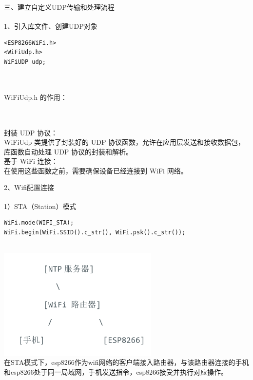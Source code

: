 \documentclass[16pt]{beamer}	%
\begin{document}
		\begin{frame}[fragile]
		三、建立自定义UDP传输和处理流程
		\\ \hspace*{\fill} \\1、引入库文件、创建UDP对象
\begin{lstlisting}
<ESP8266WiFi.h>
<WiFiUdp.h>
WiFiUDP udp;
\end{lstlisting}
		\\ \hspace*{\fill} \\WiFiUdp.h 的作用：	\\ \hspace*{\fill} \\
		\begin{small}
		\\封装 UDP 协议：\\WiFiUdp 类提供了封装好的 UDP 协议函数，允许在应用层发送和接收数据包，库函数自动处理 UDP 协议的封装和解析。
		\\基于 WiFi 连接：\\在使用这些函数之前，需要确保设备已经连接到 WiFi 网络。
	    \end{small}
	    \end{frame}
	    \begin{frame}[fragile]
	    2、Wifi配置连接
	   \\ \hspace*{\fill} \\ \small 1）STA（Station）模式
\begin{lstlisting}
WiFi.mode(WIFI_STA);
WiFi.begin(WiFi.SSID().c_str(), WiFi.psk().c_str()); 
\end{lstlisting}
\\ \includegraphics[width=0.6\textwidth]{pic/2-3.png}
\\在STA模式下，esp8266作为wifi网络的客户端接入路由器，与该路由器连接的手机和esp8266处于同一局域网，手机发送指令，esp8266接受并执行对应操作。
	    \end{frame}
\end{document}
